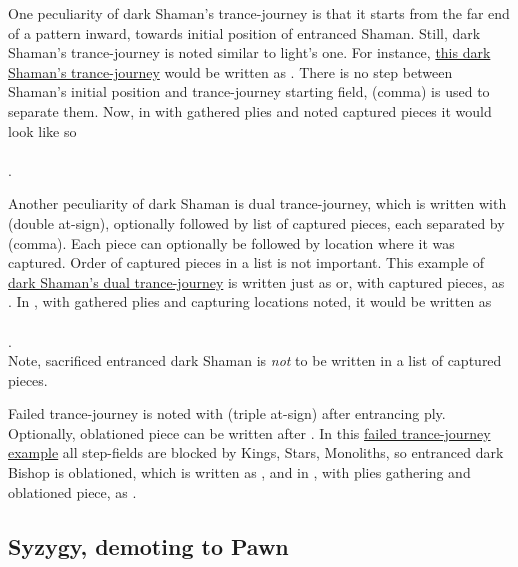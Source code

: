 One peculiarity of dark Shaman's trance-journey is that it starts from the far end of a pattern inward,
towards initial position of entranced Shaman. Still, dark Shaman's trance-journey is noted similar to
light's one. For instance,
\hyperref[fig:scn_cot_22_dark_dark_shaman_interaction_start]{this dark Shaman's trance-journey} would be
written as .
There is no step between Shaman's initial position and trance-journey starting field, \alg{,} (comma) is used
to separate them. Now, in  with gathered plies and noted captured pieces it would look like so\\
\\
\alg{[He12,w18..q16*P..k14*N..c18]}.

Another peculiarity of dark Shaman is dual trance-journey, which is written with  (double at-sign),
optionally followed by list of captured pieces, each separated by \alg{,} (comma). Each piece can optionally
be followed by location where it was captured. Order of captured pieces in a list is not important. This
example of
\hyperref[fig:scn_cot_24_dark_dark_shaman_double_interaction_start]{dark Shaman's dual trance-journey} is
written just as  or, with captured pieces, as .
In , with gathered plies and capturing locations noted, it would be written as\\
\\
.\\
Note, sacrificed entranced dark Shaman is \emph{not} to be written in a list of captured pieces.

Failed trance-journey is noted with  (triple at-sign) after entrancing ply. Optionally, oblationed
piece can be written after . In this
\hyperref[fig:scn_o_21_trance_journey_failed]{failed trance-journey example} all step-fields are blocked by
Kings, Stars, Monoliths, so entranced dark Bishop is oblationed, which is written as ,
and in , with plies gathering and oblationed piece, as .

\subsection*{Syzygy, demoting to Pawn}
\label{sec:Appendix/Notation/Syzygy, demoting to Pawn}


